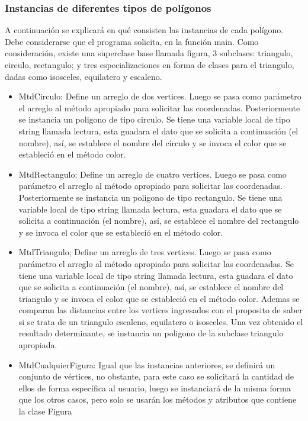 \documentclass[11pt]{article}
\begin{document}
\subsubsection{Instancias de diferentes tipos de polígonos}
	A continuación se explicará en qué consisten las instancias de cada polígono. Debe considerarse que el programa solicita, en la función main. Como consideración, existe una superclase base llamada figura, 3 subclases: triangulo, circulo, rectangulo; y tres especializaciones en forma de clases para el triangulo, dadas como isosceles, equilatero y escaleno.
	\begin{itemize}
		\item MtdCirculo: Define un arreglo de dos vertices. Luego se pasa como parámetro el arreglo al método apropiado para solicitar las coordenadas. Posteriormente se instancia un poligono de tipo circulo. Se tiene una variable local de tipo string llamada lectura, esta guadara el dato que se solicita a continuación (el nombre), así, se establece el nombre del círculo y se invoca el color que se estableció en el método color.

		\item MtdRectangulo: Define un arreglo de cuatro vertices. Luego se pasa como parámetro el arreglo al método apropiado para solicitar las coordenadas. Posteriormente se instancia un poligono de tipo rectangulo. Se tiene una variable local de tipo string llamada lectura, esta guadara el dato que se solicita a continuación (el nombre), así, se establece el nombre del rectangulo y se invoca el color que se estableció en el método color.

		\item MtdTriangulo; Define un arreglo de tres vertices. Luego se pasa como parámetro el arreglo al método apropiado para solicitar las coordenadas. Se tiene una variable local de tipo string llamada lectura, esta guadara el dato que se solicita a continuación (el nombre), así, se establece el nombre del triangulo y se invoca el color que se estableció en el método color. Ademas se comparan las distancias entre los vertices ingresados con el proposito de saber si se trata de un triangulo escaleno, equilatero o isosceles. Una vez obtenido el resultado determinante, se instancia un poligono de la subclase triangulo apropiada.

		\item MtdCualquierFigura: Igual que las instancias anteriores, se definirá un conjunto de vértices, no obstante, para este caso se solicitará la cantidad de ellos de forma específica al usuario, luego se instanciará de la misma forma que los otros casos, pero solo se usarán los métodos y atributos que contiene la clase Figura
	\end{itemize}
	
\end{document}
